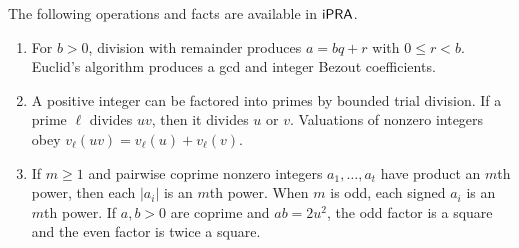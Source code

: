 \begin{lemma}\label{lem:integer-tools}
The following operations and facts are available in $\mathsf{iPRA}$.
\begin{enumerate}
 \item For $b>0$, division with remainder produces $a=bq+r$ with
 $0\leq r<b$. Euclid's algorithm produces a gcd and integer Bezout
 coefficients.
 \item A positive integer can be factored into primes by bounded trial
 division. If a prime $\ell$ divides $uv$, then it divides $u$ or $v$.
 Valuations of nonzero integers obey
 $v_\ell(uv)=v_\ell(u)+v_\ell(v)$.
 \item If $m\geq1$ and pairwise coprime nonzero integers $a_1,\ldots,a_t$ have product
 an $m$th power, then each $|a_i|$ is an $m$th power. When $m$ is odd,
 each signed $a_i$ is an $m$th power. If $a,b>0$ are coprime and
 $ab=2u^2$, the odd factor is a square and the even factor is twice a
 square.
\end{enumerate}
\end{lemma}

